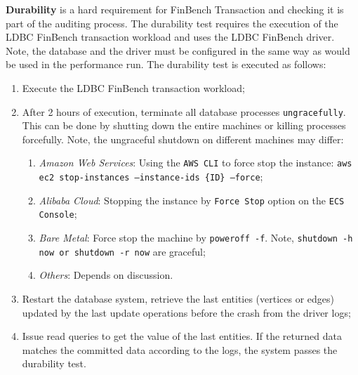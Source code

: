   {\bf Durability} is a hard requirement for FinBench Transaction and checking it
is part of the auditing process. The durability test requires the execution of
the LDBC FinBench transaction workload and uses the LDBC FinBench driver. Note,
the database and the driver must be configured in the same way as would be used
in the performance run. The durability test is executed as follows:

\begin{enumerate}[label={(\roman*)}]
  \item Execute the LDBC FinBench transaction workload;
  \item After 2 hours of execution, terminate all database processes
        \texttt{ungracefully}. This can be done by shutting down the entire
        machines or killing processes forcefully. Note, the ungraceful shutdown
        on different machines may differ:
        \begin{enumerate}[label={(\alph*)}]
          \item \emph{Amazon Web Services}: Using the \texttt{AWS CLI} to force
                stop the instance:
                \texttt{aws ec2 stop-instances --instance-ids \{ID\} --force};
          \item \emph{Alibaba Cloud}: Stopping the instance by \texttt{Force Stop}
                option on the \texttt{ECS Console};
          \item \emph{Bare Metal}: Force stop the machine by \texttt{poweroff -f}.
                Note, \texttt{shutdown -h now or shutdown -r now} are graceful;
          \item \emph{Others}: Depends on discussion.
        \end{enumerate}
  \item Restart the database system, retrieve the last entities (vertices or edges)
        updated by the last update operations before the crash from the driver
        logs;
  \item Issue read queries to get the value of the last entities. If the returned
        data matches the committed data according to the logs, the system
        passes the durability test.
\end{enumerate}

